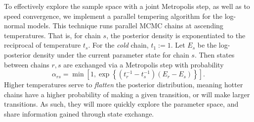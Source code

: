To effectively explore the sample space with a joint Metropolis step, as well as
    to speed convergence, we implement a parallel tempering algorithm\citep{earl2005} 
    for the log-normal models. This technique runs parallel MCMC
    chains at ascending temperatures. That is, for chain $s$, the posterior density is 
    exponentiated to the reciprocal of temperature $t_s$.  For the \emph{cold} chain, 
    $t_1 := 1$.  Let $E_s$ be the log-posterior density under the current parameter 
    state for chain $s$.  Then states between chains $r,s$ are exchanged via a Metropolis 
    step with probability 
    \[
    \alpha_{rs} = \min
    \left[1, \exp\left\lbrace(t_{r}^{-1} - t_{s}^{-1})(E_r - E_s)\right\rbrace\right].
    \]
    Higher temperatures serve to \emph{flatten} the posterior distribution, meaning hotter
    chains have a higher probability of making a given transition, or will make larger 
    transitions.  As such, they will more quickly explore the parameter space, and share
    information gained through state exchange.

